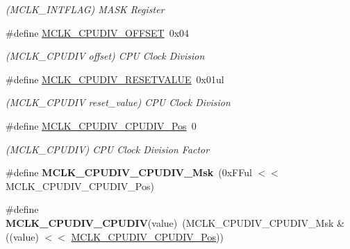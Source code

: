 \begin{DoxyCompactItemize}
\begin{DoxyCompactList}\small\item\em (M\+C\+L\+K\+\_\+\+I\+N\+T\+F\+L\+A\+G) M\+A\+S\+K Register \end{DoxyCompactList}\item 
\hypertarget{group___s_a_m_l21___m_c_l_k_ga6b856556e549869e608b1c9d9ca335ff}{}\#define \hyperlink{group___s_a_m_l21___m_c_l_k_ga6b856556e549869e608b1c9d9ca335ff}{M\+C\+L\+K\+\_\+\+C\+P\+U\+D\+I\+V\+\_\+\+O\+F\+F\+S\+E\+T}~0x04\label{group___s_a_m_l21___m_c_l_k_ga6b856556e549869e608b1c9d9ca335ff}

\begin{DoxyCompactList}\small\item\em (M\+C\+L\+K\+\_\+\+C\+P\+U\+D\+I\+V offset) C\+P\+U Clock Division \end{DoxyCompactList}\item 
\hypertarget{group___s_a_m_l21___m_c_l_k_gad5b446415ed860f94d2368945fa4b698}{}\#define \hyperlink{group___s_a_m_l21___m_c_l_k_gad5b446415ed860f94d2368945fa4b698}{M\+C\+L\+K\+\_\+\+C\+P\+U\+D\+I\+V\+\_\+\+R\+E\+S\+E\+T\+V\+A\+L\+U\+E}~0x01ul\label{group___s_a_m_l21___m_c_l_k_gad5b446415ed860f94d2368945fa4b698}

\begin{DoxyCompactList}\small\item\em (M\+C\+L\+K\+\_\+\+C\+P\+U\+D\+I\+V reset\+\_\+value) C\+P\+U Clock Division \end{DoxyCompactList}\item 
\hypertarget{group___s_a_m_l21___m_c_l_k_gae6faf0af5e1e22725e3c3080e2b94af7}{}\#define \hyperlink{group___s_a_m_l21___m_c_l_k_gae6faf0af5e1e22725e3c3080e2b94af7}{M\+C\+L\+K\+\_\+\+C\+P\+U\+D\+I\+V\+\_\+\+C\+P\+U\+D\+I\+V\+\_\+\+Pos}~0\label{group___s_a_m_l21___m_c_l_k_gae6faf0af5e1e22725e3c3080e2b94af7}

\begin{DoxyCompactList}\small\item\em (M\+C\+L\+K\+\_\+\+C\+P\+U\+D\+I\+V) C\+P\+U Clock Division Factor \end{DoxyCompactList}\item 
\hypertarget{group___s_a_m_l21___m_c_l_k_gac4c71bf8b27ccc014cad4e42a0ffcc34}{}\#define {\bfseries M\+C\+L\+K\+\_\+\+C\+P\+U\+D\+I\+V\+\_\+\+C\+P\+U\+D\+I\+V\+\_\+\+Msk}~(0x\+F\+Ful $<$$<$ M\+C\+L\+K\+\_\+\+C\+P\+U\+D\+I\+V\+\_\+\+C\+P\+U\+D\+I\+V\+\_\+\+Pos)\label{group___s_a_m_l21___m_c_l_k_gac4c71bf8b27ccc014cad4e42a0ffcc34}

\item 
\hypertarget{group___s_a_m_l21___m_c_l_k_ga12595592ea99f05db67f87b18bfad62b}{}\#define {\bfseries M\+C\+L\+K\+\_\+\+C\+P\+U\+D\+I\+V\+\_\+\+C\+P\+U\+D\+I\+V}(value)~(M\+C\+L\+K\+\_\+\+C\+P\+U\+D\+I\+V\+\_\+\+C\+P\+U\+D\+I\+V\+\_\+\+Msk \& ((value) $<$$<$ \hyperlink{group___s_a_m_l21___m_c_l_k_gae6faf0af5e1e22725e3c3080e2b94af7}{M\+C\+L\+K\+\_\+\+C\+P\+U\+D\+I\+V\+\_\+\+C\+P\+U\+D\+I\+V\+\_\+\+Pos}))\label{group___s_a_m_l21___m_c_l_k_ga12595592ea99f05db67f87b18bfad62b}


\end{DoxyCompactItemize}
